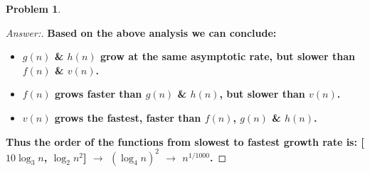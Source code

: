 \documentclass[11pt]{article}
\theoremstyle{definition}
\theoremstyle{definition}
\newtheorem{required}{Problem}
\theoremstyle{definition}
\begin{document}
\begin{required}
\begin{enumerate} [label=(\alph*)]
\begin{proof}[Answer:]
\item \textbf{Based on the above analysis we can conclude:}
\begin{itemize}
\item \textbf{$g(n)$ \& $h(n)$ grow at the same asymptotic rate, but slower than $f(n)$ \& $v(n)$.}
\item \textbf{$f(n)$ grows faster than $g(n)$ \& $h(n)$, but slower than $v(n)$.}
\item \textbf{$v(n)$ grows the fastest, faster than $f(n)$, $g(n)$ \& $h(n)$.}
\end{itemize}
\item \textbf{Thus the order of the functions from slowest to fastest growth rate is: [$10 \log_3 n$, $\log_2 n^2$] $\to$ $(\log_4 n)^2$ $\to$ $n^{1/1000}$.}

\end{proof}
\end{enumerate}

\end{required}

\newpage
\end{document}
